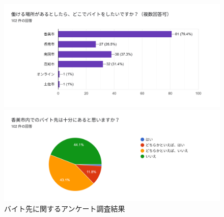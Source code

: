 \begin{figure}[h]
  \centering
  \begin{minipage}{0.43\columnwidth}
    \centering
    \includegraphics[width=\columnwidth]{働く場所の希望_アンケート結果.png}
  \end{minipage}
  \hspace{5mm}
  \begin{minipage}{0.43\columnwidth}
    \centering
    \includegraphics[width=\columnwidth]{香美市でのバイト先が十分にあるか_アンケート結果.png}
  \end{minipage}
  \caption{バイト先に関するアンケート調査結果}
  \label{fig:アンケート}
\end{figure}
